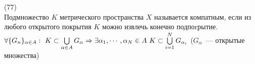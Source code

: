 (77)\\
Подмножество $K$ метрического пространства $X$  называется компатным, если из любого открытого покрытия $K$ можно извлечь конечно подпоrрытие.\\
$\forall \{G_n\}_{\alpha \in A}:\ K \subset \bigcup\limits_{\alpha \in A} G_{\alpha} \Rightarrow \exists \alpha_1, \cdots, \alpha_N \in A\ K \subset \bigcup\limits^N_{i = 1} G_{\alpha_i}$ ($G_{\alpha}$~--- открытые множества)